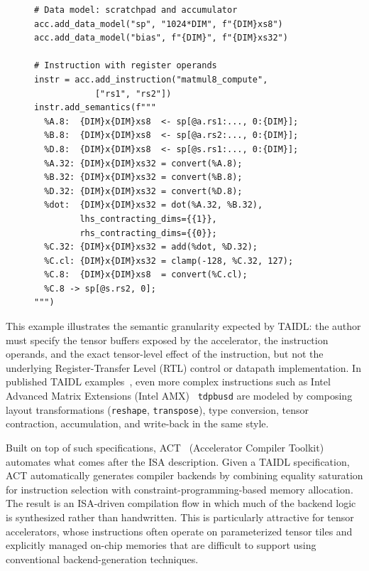\begin{figure}[h]
\begin{lstlisting}[style=taidl, caption={Simplified TAIDL specification for a Gemmini multiply-accumulate instruction (adapted from~\cite{taidl-ae-micro2025}). Only the core tensor semantics are shown; the full specification additionally includes dataflow routing and state constraint logic.}, label={lst:taidl-example}]
# Data model: scratchpad and accumulator
acc.add_data_model("sp", "1024*DIM", f"{DIM}xs8")
acc.add_data_model("bias", f"{DIM}", f"{DIM}xs32")

# Instruction with register operands
instr = acc.add_instruction("matmul8_compute",
            ["rs1", "rs2"])
instr.add_semantics(f"""
  %A.8:  {DIM}x{DIM}xs8  <- sp[@a.rs1:..., 0:{DIM}];
  %B.8:  {DIM}x{DIM}xs8  <- sp[@a.rs2:..., 0:{DIM}];
  %D.8:  {DIM}x{DIM}xs8  <- sp[@s.rs1:..., 0:{DIM}];
  %A.32: {DIM}x{DIM}xs32 = convert(%A.8);
  %B.32: {DIM}x{DIM}xs32 = convert(%B.8);
  %D.32: {DIM}x{DIM}xs32 = convert(%D.8);
  %dot:  {DIM}x{DIM}xs32 = dot(%A.32, %B.32),
         lhs_contracting_dims={{1}},
         rhs_contracting_dims={{0}};
  %C.32: {DIM}x{DIM}xs32 = add(%dot, %D.32);
  %C.cl: {DIM}x{DIM}xs32 = clamp(-128, %C.32, 127);
  %C.8:  {DIM}x{DIM}xs8  = convert(%C.cl);
  %C.8 -> sp[@s.rs2, 0];
""")
\end{lstlisting}
\end{figure}

\noindent This example illustrates the semantic granularity expected by TAIDL: the author must specify the tensor buffers exposed by the accelerator, the instruction operands, and the exact tensor-level effect of the instruction, but not the underlying Register-Transfer Level (RTL) control or datapath implementation. In published TAIDL examples~\cite{taidl-ae-micro2025}, even more complex instructions such as Intel Advanced Matrix Extensions (Intel AMX)~\cite{amx} \texttt{tdpbusd} are modeled by composing layout transformations (\texttt{reshape}, \texttt{transpose}), type conversion, tensor contraction, accumulation, and write-back in the same style.

Built on top of such specifications, ACT~\cite{act-arxiv} (Accelerator Compiler Toolkit) automates what comes after the ISA description. Given a TAIDL specification, ACT automatically generates compiler backends by combining equality saturation for instruction selection with constraint-programming-based memory allocation. The result is an ISA-driven compilation flow in which much of the backend logic is synthesized rather than handwritten. This is particularly attractive for tensor accelerators, whose instructions often operate on parameterized tensor tiles and explicitly managed on-chip memories that are difficult to support using conventional backend-generation techniques.

